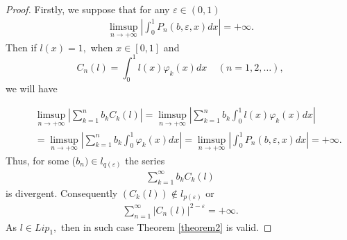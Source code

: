 \documentclass{publmathdeb}
\begin{document}
	\begin{proof}
		Firstly, we suppose that for any $\varepsilon \in (0,1)$
		\begin{eqnarray*}
			\limsup_{n \rightarrow +\infty} \left|\int_{0}^{1} P_n (b, \varepsilon, x) dx\right| =+ \infty.
		\end{eqnarray*} 
		Then if $l(x)=1,$ when $x\in [0,1]$ and $$C_n(l)=\int_{0}^{1}l(x) \varphi_{k}(x) dx \ \ \ \ \ (n=1,2, \dots),$$
		we will have	
		
		\begin{eqnarray*}
			&&\limsup_{n \rightarrow +\infty} \left|\sum_{k=1}^{n} b_k C_k (l)\right| = \limsup_{n \rightarrow +\infty} \left|\sum_{k=1}^{n} b_k \int_{0}^{1}l(x) \varphi_{k}(x) dx \right| \\
			&&=  \limsup_{n \rightarrow +\infty}  \left|\sum_{k=1}^{n} b_k \int_{0}^{1} \varphi_{k}(x) dx \right| = \limsup_{n \rightarrow +\infty} \left|\int_{0}^{1} P_n (b, \varepsilon, x) dx\right| =+ \infty.
		\end{eqnarray*}
		Thus, for some ($b_n) \in l_{q(\varepsilon)}$ the series	
		\begin{eqnarray*}
			\sum_{k=1}^{\infty} b_k C_k (l)
		\end{eqnarray*}
		is divergent. Consequently $(C_k (l)) \notin l_{p(\varepsilon)}$ or 
		\begin{eqnarray*}
			\sum_{n=1}^{\infty} \left|C_n(l)\right|^{2-\varepsilon} =+\infty.
		\end{eqnarray*}
		As $l \in Lip_1,$ then in such case Theorem \ref{theorem2} is valid.
		

\end{proof}
\end{document}
